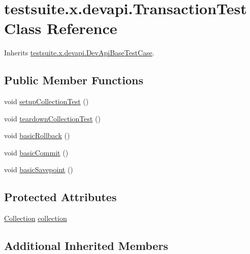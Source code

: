 \hypertarget{classtestsuite_1_1x_1_1devapi_1_1_transaction_test}{}\section{testsuite.\+x.\+devapi.\+Transaction\+Test Class Reference}
\label{classtestsuite_1_1x_1_1devapi_1_1_transaction_test}


Inherits \mbox{\hyperlink{classtestsuite_1_1x_1_1devapi_1_1_dev_api_base_test_case}{testsuite.\+x.\+devapi.\+Dev\+Api\+Base\+Test\+Case}}.

\subsection*{Public Member Functions}
\begin{DoxyCompactItemize}
\item 
void \mbox{\hyperlink{classtestsuite_1_1x_1_1devapi_1_1_transaction_test_ada3dbd82588094abecb9890ff359e651}{setup\+Collection\+Test}} ()
\item 
void \mbox{\hyperlink{classtestsuite_1_1x_1_1devapi_1_1_transaction_test_a822e4978fef487a56693c92b5a01813c}{teardown\+Collection\+Test}} ()
\item 
void \mbox{\hyperlink{classtestsuite_1_1x_1_1devapi_1_1_transaction_test_a3cf4d848d7fb3d3017c7b9b264c619e2}{basic\+Rollback}} ()
\item 
void \mbox{\hyperlink{classtestsuite_1_1x_1_1devapi_1_1_transaction_test_a08d92138bc30ce02d654a7b5745bf6bd}{basic\+Commit}} ()
\item 
void \mbox{\hyperlink{classtestsuite_1_1x_1_1devapi_1_1_transaction_test_a45c0eafdd6f0521793c4fe94b0dcc495}{basic\+Savepoint}} ()
\end{DoxyCompactItemize}
\subsection*{Protected Attributes}
\begin{DoxyCompactItemize}
\item 
\mbox{\hyperlink{interfacecom_1_1mysql_1_1cj_1_1xdevapi_1_1_collection}{Collection}} \mbox{\hyperlink{classtestsuite_1_1x_1_1devapi_1_1_transaction_test_a0d7538a90a1ac03709e7a3f2efb25968}{collection}}
\end{DoxyCompactItemize}
\subsection*{Additional Inherited Members}


